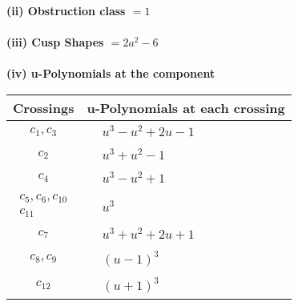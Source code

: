 \documentclass[1p]{elsarticle_modified}
\theoremstyle{definition}
\begin{document}
\flushleft \textbf{(ii) Obstruction class $= 1$}\\~\\
\flushleft \textbf{(iii) Cusp Shapes $= 2 a^2-6$}\\~\\
\newpage\renewcommand{\arraystretch}{1}
\flushleft \textbf{(iv) u-Polynomials at the component}\newline \\
\begin{tabular}{m{50pt}|m{274pt}}
Crossings & \hspace{64pt}u-Polynomials at each crossing \\
\hline $$\begin{aligned}c_{1},c_{3}\end{aligned}$$&$\begin{aligned}
&u^3- u^2+2 u-1
\end{aligned}$\\
\hline $$\begin{aligned}c_{2}\end{aligned}$$&$\begin{aligned}
&u^3+u^2-1
\end{aligned}$\\
\hline $$\begin{aligned}c_{4}\end{aligned}$$&$\begin{aligned}
&u^3- u^2+1
\end{aligned}$\\
\hline $$\begin{aligned}c_{5},c_{6},c_{10}\\c_{11}\end{aligned}$$&$\begin{aligned}
&u^3
\end{aligned}$\\
\hline $$\begin{aligned}c_{7}\end{aligned}$$&$\begin{aligned}
&u^3+u^2+2 u+1
\end{aligned}$\\
\hline $$\begin{aligned}c_{8},c_{9}\end{aligned}$$&$\begin{aligned}
&(u-1)^3
\end{aligned}$\\
\hline $$\begin{aligned}c_{12}\end{aligned}$$&$\begin{aligned}
&(u+1)^3
\end{aligned}$\\
\hline
\end{tabular}\\~\\
\end{document}
